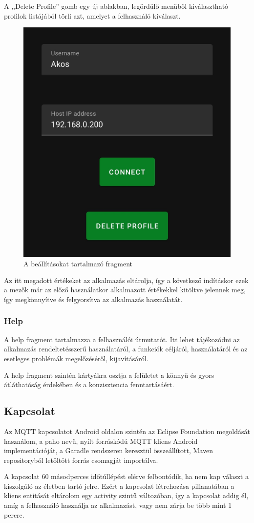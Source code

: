\documentclass[]{thesis-ekf}
\theoremstyle{definition}
\theoremstyle{remark}
\begin{document}
A ,,Delete Profile'' gomb egy új ablakban, legördülő menüből kiválasztható profilok listájából törli azt, amelyet a
felhasználó kiválaszt.
\begin{figure}[ht]
	\centering
	\includegraphics[width=0.5\linewidth]{images/connect.jpg}
	\caption{A beállításokat tartalmazó fragment}
\end{figure}

Az itt megadott értékeket az alkalmazás eltárolja, így a következő indításkor ezek a mezők már az előző használatkor
alkalmazott értékekkel kitöltve jelennek meg, így megkönnyítve és felgyorsítva az alkalmazás használatát.

\subsubsection{Help}
A help fragment tartalmazza a felhasználói útmutatót. Itt lehet tájékozódni az alkalmazás rendeltetésszerű használatáról,
a funkciók céljáról, használatáról és az esetleges problémák megelőzéséről, kijavításáról.

A help fragment szintén kártyákra osztja a felületet a könnyű és gyors átláthatóság érdekében és a
konzisztencia fenntartásáért.

\subsection{Kapcsolat}
Az MQTT kapcsolatot Android oldalon szintén az Eclipse Foundation megoldását használom, a paho\cite{paho} nevű,
nyílt forráskódú MQTT kliens Android implementációját, a Garadle rendszeren keresztül összeállított,
Maven repositoryból letöltött forrás csomagját importálva.

A kapcsolat 60 másodperces időtúllépést elérve felbontódik, ha nem kap választ a kiszolgáló az életben tartó
jelre. Ezért a kapcsolat létrehozása pillanatában a kliens entitását eltárolom egy activity szintű változóban,
így a kapcsolat addig él, amíg a felhasználó használja az alkalmazást, vagy nem zárja be több mint 1 percre.
\end{document}
